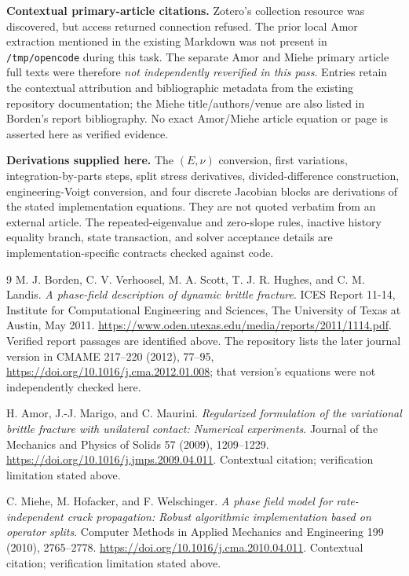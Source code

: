 \documentclass[11pt,a4paper]{article}
\newcommand{\code}[1]{\texttt{\small #1}}
\numberwithin{equation}{section}
\begin{document}
\textbf{Contextual primary-article citations.} Zotero's collection resource was
discovered, but access returned connection refused. The prior local Amor
extraction mentioned in the existing Markdown was not present in
\code{/tmp/opencode} during this task. The separate Amor and Miehe primary
article full texts were therefore \emph{not independently reverified in this
pass}. Entries \cite{amor,miehe} retain the contextual attribution and
bibliographic metadata from the existing repository documentation; the Miehe
title/authors/venue are also listed in Borden's report bibliography. No exact
Amor/Miehe article equation or page is asserted here as verified evidence.

\textbf{Derivations supplied here.} The $(E,\nu)$ conversion, first variations,
integration-by-parts steps, split stress derivatives, divided-difference
construction, engineering-Voigt conversion, and four discrete Jacobian blocks
are derivations of the stated implementation equations. They are not quoted
verbatim from an external article. The repeated-eigenvalue and zero-slope rules,
inactive history equality branch, state transaction, and solver acceptance
details are implementation-specific contracts checked against code.

\begingroup\small
\begin{thebibliography}{9}
M. J. Borden, C. V. Verhoosel, M. A. Scott, T. J. R. Hughes, and C. M. Landis.
\emph{A phase-field description of dynamic brittle fracture}.
ICES Report 11-14, Institute for Computational Engineering and Sciences,
The University of Texas at Austin, May 2011.
\url{https://www.oden.utexas.edu/media/reports/2011/1114.pdf}.
Verified report passages are identified above. The repository lists the later
journal version in CMAME 217--220 (2012), 77--95,
\url{https://doi.org/10.1016/j.cma.2012.01.008}; that version's equations were
not independently checked here.

H. Amor, J.-J. Marigo, and C. Maurini.
\emph{Regularized formulation of the variational brittle fracture with
unilateral contact: Numerical experiments}.
Journal of the Mechanics and Physics of Solids 57 (2009), 1209--1229.
\url{https://doi.org/10.1016/j.jmps.2009.04.011}.
Contextual citation; verification limitation stated above.

C. Miehe, M. Hofacker, and F. Welschinger.
\emph{A phase field model for rate-independent crack propagation:
Robust algorithmic implementation based on operator splits}.
Computer Methods in Applied Mechanics and Engineering 199 (2010), 2765--2778.
\url{https://doi.org/10.1016/j.cma.2010.04.011}.
Contextual citation; verification limitation stated above.
\end{thebibliography}
\endgroup
\end{document}

